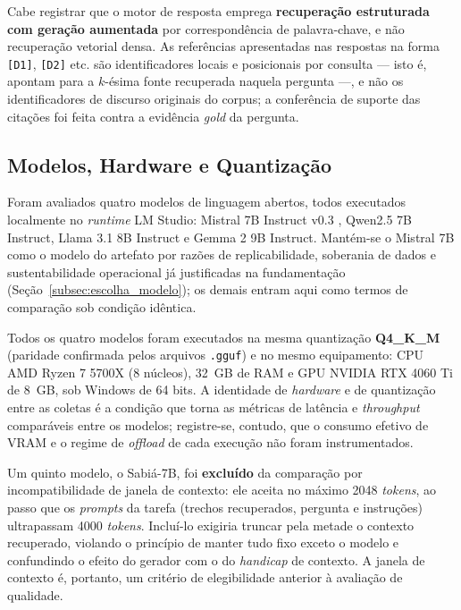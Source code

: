 Cabe registrar que o motor de resposta emprega \textbf{recuperação estruturada com geração aumentada} por correspondência de palavra-chave, e não recuperação vetorial densa. As referências apresentadas nas respostas na forma \texttt{[D1]}, \texttt{[D2]} etc. são identificadores locais e posicionais por consulta --- isto é, apontam para a $k$-ésima fonte recuperada naquela pergunta ---, e não os identificadores de discurso originais do corpus; a conferência de suporte das citações foi feita contra a evidência \textit{gold} da pergunta.

\subsection{Modelos, Hardware e Quantização}
Foram avaliados quatro modelos de linguagem abertos, todos executados localmente no \textit{runtime} LM Studio: Mistral 7B Instruct v0.3 \cite{Jiang2023}, Qwen2.5 7B Instruct, Llama 3.1 8B Instruct e Gemma 2 9B Instruct. Mantém-se o Mistral 7B como o modelo do artefato por razões de replicabilidade, soberania de dados e sustentabilidade operacional já justificadas na fundamentação (Seção~\ref{subsec:escolha_modelo}); os demais entram aqui como termos de comparação sob condição idêntica.

Todos os quatro modelos foram executados na mesma quantização \textbf{Q4\_K\_M} (paridade confirmada pelos arquivos \texttt{.gguf}) e no mesmo equipamento: CPU AMD Ryzen 7 5700X (8 núcleos), 32~GB de RAM e GPU NVIDIA RTX 4060 Ti de 8~GB, sob Windows de 64 bits. A identidade de \textit{hardware} e de quantização entre as coletas é a condição que torna as métricas de latência e \textit{throughput} comparáveis entre os modelos; registre-se, contudo, que o consumo efetivo de VRAM e o regime de \textit{offload} de cada execução não foram instrumentados.

Um quinto modelo, o Sabiá-7B, foi \textbf{excluído} da comparação por incompatibilidade de janela de contexto: ele aceita no máximo 2048 \textit{tokens}, ao passo que os \textit{prompts} da tarefa (trechos recuperados, pergunta e instruções) ultrapassam 4000 \textit{tokens}. Incluí-lo exigiria truncar pela metade o contexto recuperado, violando o princípio de manter tudo fixo exceto o modelo e confundindo o efeito do gerador com o do \textit{handicap} de contexto. A janela de contexto é, portanto, um critério de elegibilidade anterior à avaliação de qualidade.

